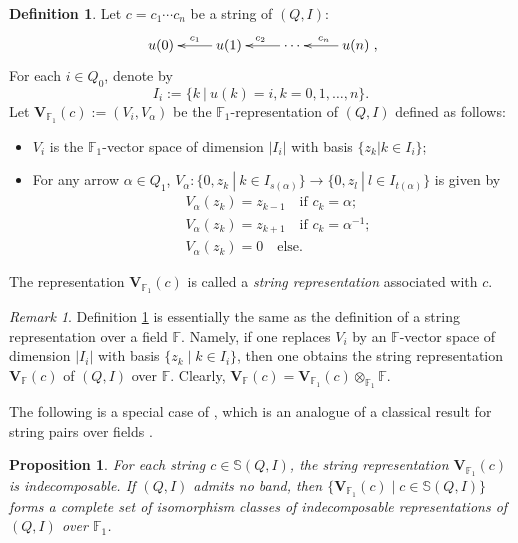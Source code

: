 \documentclass[12pt]{amsart}
\newtheorem{proposition}[theorem]{Proposition}
\theoremstyle{remark}
\newtheorem{remark}[theorem]{Remark}
\theoremstyle{definition}
\newtheorem{definition}[theorem]{Definition}
\numberwithin{equation}{section}
\begin{document}
\begin{definition}\label{def:string-rep}
Let $c=c_1\cdots c_n$ be a string of $(Q,I)$:
\[
\xymatrix{
u(0) & u(1)\ar[l]_{c_1} & \cdots\ar[l]_{c_2} & u(n)\ar[l]_{c_n}
},
\]
For each $i\in Q_0$, denote by 
\[
I_i:=\{k~|~u(k)=i, k=0,1,\dots, n\}.
\]
Let $\mathbf{V}_{\mathbb{F}_1}(c):=({V}_i,{V}_\alpha)$ be the $\mathbb{F}_1$-representation of $(Q,I)$ defined as follows:
\begin{itemize}
    \item ${V}_i$ is the $\mathbb{F}_1$-vector space of dimension $|I_i|$ with basis $\{z_k | k\in I_i\}$;
    \item  For any arrow $\alpha\in Q_1$, ${V}_\alpha:\{0,z_k~|~k\in I_{s(\alpha)}\}\to \{0,z_l~|~l\in I_{t(\alpha)}\}$ is given by
    \begin{align*}
    &{V}_\alpha(z_k)=z_{k-1} \quad \text{if $c_k=\alpha$};\\
    &{V}_\alpha(z_k)=z_{k+1} \quad \text{if $c_k=\alpha^{-1}$};\\
    &{V}_\alpha(z_k)=0\quad \text{else}.
    \end{align*}
\end{itemize}
The representation $\mathbf{V}_{\mathbb{F}_1}(c)$ is called  a {\em string representation} associated with $c$.
\end{definition}
\begin{remark}
Definition \ref{def:string-rep} is essentially the same as the definition of a string representation over a field $\mathbb{F}$. Namely, if one replaces $V_i$ by an $\mathbb{F}$-vector space of dimension $|I_i|$ with basis $\{z_k\mid k\in I_i\}$, then one obtains the string representation $\mathbf{V}_\mathbb{F}(c)$ of $(Q,I)$ over  $\mathbb{F}$. Clearly, $\mathbf{V}_\mathbb{F}(c)=\mathbf{V}_{\mathbb{F}_1}(c)\otimes_{\mathbb{F}_1}\mathbb{F}$.
\end{remark}


The following is a special case of \cite[Theorem 3.9]{TF25}, which is an analogue of a classical result for string pairs over fields \cite{BR87}.
\begin{proposition}\label{prop:classification-string-rep}
    For each string $c\in \mathbb{S}(Q,I)$, the string representation $\mathbf{V}_{\mathbb{F}_1}(c)$ is indecomposable. If $(Q,I)$ admits no band, then $\{\mathbf{V}_{\mathbb{F}_1}(c)\mid c\in \mathbb{S}(Q,I)\}$ forms a complete set of isomorphism classes of indecomposable representations of $(Q,I)$ over $\mathbb{F}_1$.
\end{proposition}
\end{document}
